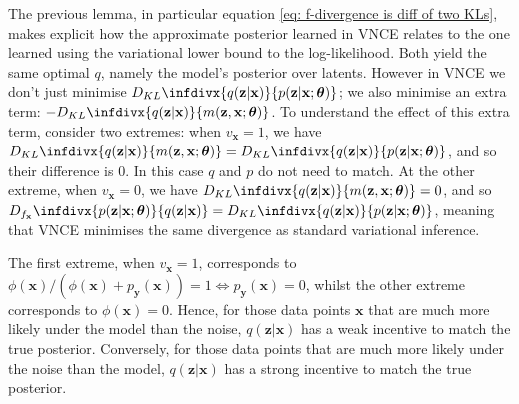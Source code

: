 \documentclass[11pt, oneside]{article}
\newcommand{\thetab}{{\boldsymbol{\theta}}}
\newcommand{\pnn}{\phi}
\newcommand{\pnoise}{p_{ \mathbf y}}
\newcommand{\x}{{\mathbf x}}
\newcommand{\z}{{\mathbf z}}
\theoremstyle{definition}
\newcommand{\infdiv}[1]{D_{#1}\infdivx}
\begin{document}
The previous lemma, in particular equation \ref{eq: f-divergence is diff of two KLs}, makes explicit how the approximate posterior learned in  VNCE relates to the one learned using the variational lower bound to the log-likelihood. Both yield the same optimal $q$, namely the model's posterior over latents. However in VNCE we don't just minimise $\infdiv{KL}{q(\z | \x)}{p(\z | \x; \thetab)}$; we also minimise an extra term: $-\infdiv{KL}{q(\z | \x)}{m(\z, \x ; \thetab)}$. To understand the effect of this extra term, consider two extremes: when $v_{\x} = 1$, we have $\infdiv{KL}{q(\z | \x)}{m(\z, \x ; \thetab)} = \infdiv{KL}{q(\z | \x)}{p(\z | \x; \thetab)}$, and so their difference is 0. In this case $q$ and $p$ do not need to match. At the other extreme, when $v_{\x} = 0$, we have $\infdiv{KL}{q(\z | \x)}{m(\z, \x ; \thetab)} = 0$, and so $\infdiv{f_{\x}}{p(\z | \x; \thetab)}{q(\z | \x)} = \infdiv{KL}{q(\z | \x)}{p(\z | \x; \thetab)}$, meaning that VNCE minimises the same divergence as standard variational inference. 

The first extreme, when $v_{\x} = 1$, corresponds to $\pnn(\x)/(\pnn(\x) + \pnoise(\x)) = 1 \Leftrightarrow \pnoise(\x) = 0$, whilst the other extreme corresponds to $\pnn(\x) = 0$. Hence, for those data points $\x$ that are much more likely under the model than the noise, $q(\z | \x)$ has a weak incentive to match the true posterior. Conversely, for those data points that are much more likely under the noise than the model, $q(\z | \x)$ has a strong incentive to match the true posterior.
\end{document}
